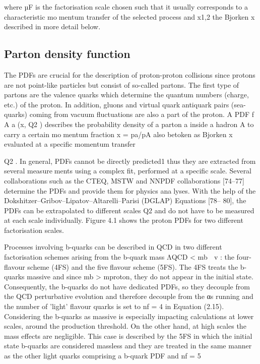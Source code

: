 where µF is the factorisation scale chosen such that it usually corresponds to a characteristic momentum transfer of the selected process and x1,2 the Bjorken x described in more detail below.


\subsection{Parton density function}

The PDFs are crucial for the description of proton-proton collisions since protons are not point-like
particles but consist of so-called partons. The first type of partons are the valence quarks which
determine the quantum numbers (charge, etc.) of the proton. In addition, gluons and virtual quarkantiquark pairs (sea-quarks) coming from vacuum fluctuations are also a part of the proton. A PDF
f
A
a (x, Q2
) describes the probability density of a parton a inside a hadron A to carry a certain momentum fraction x = pa/pA also betoken as Bjorken x evaluated at a specific momentum transfer

Q2
. In general, PDFs cannot be directly predicted1 %
thus they are extracted from several measurements using a complex fit, performed at a specific scale. Several collaborations such as the CTEQ,
MSTW and NNPDF collaborations [74–77] determine the PDFs and provide them for physics analyses. With the help of the Dokshitzer–Gribov–Lipatov–Altarelli–Parisi (DGLAP) Equations [78–
80], the PDFs can be extrapolated to different scales Q2
and do not have to be measured at each
scale individually. Figure 4.1 shows the proton PDFs for two different factorisation scales.

Processes involving b-quarks can be described in QCD in two different factorisation schemes
arising from the b-quark mass ΛQCD < mb  v : the four-flavour scheme (4FS) and the fiveflavour scheme (5FS). The 4FS treats the b-quarks massive and since mb > mproton, they do not
appear in the initial state. Consequently, the b-quarks do not have dedicated PDFs, so they decouple
from the QCD perturbative evolution and therefore decouple from the αs running and the number
of ’light’ flavour quarks is set to nf = 4 in Equation (2.15). Considering the b-quarks as massive
is especially impacting calculations at lower scales, around the production threshold. On the other
hand, at high scales the mass effects are negligible. This case is described by the 5FS in which the
initial state b-quarks are considered massless and they are treated in the same manner as the other
light quarks comprising a b-quark PDF and nf = 5

